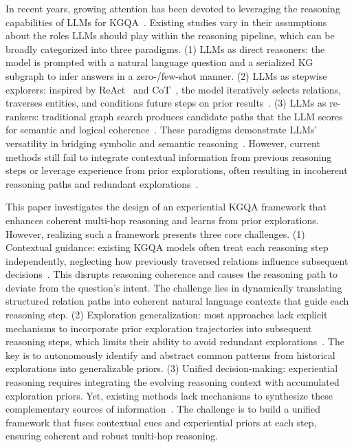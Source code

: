In recent years, growing attention has been devoted to leveraging the reasoning capabilities of LLMs for KGQA~\cite{yu2022decaf,liu2025dual}. Existing studies vary in their assumptions about the roles LLMs should play within the reasoning pipeline, which can be broadly categorized into three paradigms. (1) LLMs as direct reasoners: the model is prompted with a natural language question and a serialized KG subgraph to infer answers in a zero-/few-shot manner\cite{sun2023think,bi2024forest}. (2) LLMs as stepwise explorers: inspired by ReAct~\cite{Yao2022ReActSR} and CoT~\cite{wei2022chain}, the model iteratively selects relations, traverses entities, and conditions future steps on prior results~\cite{wang2025dynamically,shen2025reasoning}. (3) LLMs as re-rankers: traditional graph search produces candidate paths that the LLM scores for semantic and logical coherence~\cite{liu2025dual,yao2025learning}. These paradigms demonstrate LLMs’ versatility in bridging symbolic and semantic reasoning~\cite{saxena2020improving,zhang2022subgraph}.
However, current methods still fail to integrate contextual information from previous reasoning steps or leverage experience from prior explorations, often resulting in incoherent reasoning paths and redundant explorations~\cite{shen2025reasoning}.


This paper investigates the design of an experiential KGQA framework that enhances coherent multi-hop reasoning and learns from prior explorations. However, realizing such a framework presents three core challenges. (1) Contextual guidance: existing KGQA models often treat each reasoning step independently, neglecting how previously traversed relations influence subsequent decisions~\cite{wang2025dynamically,shen2025reasoning}. This disrupts reasoning coherence and causes the reasoning path to deviate from the question’s intent. The challenge lies in dynamically translating structured relation paths into coherent natural language contexts that guide each reasoning step. (2) Exploration generalization: most approaches lack explicit mechanisms to incorporate prior exploration trajectories into subsequent reasoning steps, which limits their ability to avoid redundant explorations~\cite{ma2025debate,yao2025learning}. The key is to autonomously identify and abstract common patterns from historical explorations into generalizable priors. (3) Unified decision-making: experiential reasoning requires integrating the evolving reasoning context with accumulated exploration priors. Yet, existing methods lack mechanisms to synthesize these complementary sources of information~\cite{liu2025dual,ma2025large}. The challenge is to build a unified framework that fuses contextual cues and experiential priors at each step, ensuring coherent and robust multi-hop reasoning.


